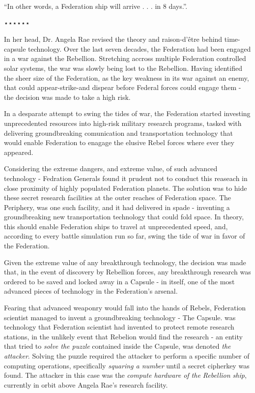 \documentclass[smalldemyvopaper,11pt,twoside,onecolumn,openright,extrafontsizes]{memoir}
\begin{document}
 “In other words, a Federation ship will arrive . . . in 8 days.”.

⋆⋆⋆⋆⋆⋆


In her head, Dr. Angela Rae revised the theory and raison-d’être behind time-capsule technology. Over the last seven decades, the Federation had been engaged in a war against the Rebellion. Stretching accross multiple Federation controlled solar systems, the war was slowly being lost to the Rebellion. Having identified the sheer size of the Federation, as the key weakness in its war against an enemy, that could appear-strike-and dispear before Federal forces could engage them - the decision was made to take a high risk.

 
 In a desparate attempt to swing the tides of war, the Federation started investing unprecedented resources into high-risk military research programs, tasked with delivering groundbreaking comunication and transportation technology that would enable Federation to enagage the elusive Rebel forces where ever they appeared.

 
  Considering the extreme dangers, and extreme value, of such advanced technology - Fedration Generals found it prudent not to conduct this reaseach in close proximity of highly populated Federation planets. The solution was to hide these secret research facilities at the outer reaches of Federation space. The Periphery, was one such facility, and it had delivered in spade - inventing a groundbreaking new transportation technology that could fold space. In theory, this should enable Federation ships to travel at unprecedented speed, and, according to every battle simulation run so far, swing the tide of war in favor of the Federation.

 
  Given the extreme value of any breakthrough technology, the decision was made that, in the event of discovery by Rebellion forces, any breakthrough research was ordered to be saved and locked away in a Capsule - in itself, one of the most advanced pieces of technology in the Federation’s arsenal.

 
  Fearing that advanced weaponry would fall into the hands of Rebels, Federation scientist managed to invent a groundbreaking technology - The Capsule. was technology that Federation scientist had invented to protect remote research stations, in the unlikely event that Rebelion would find the research - an entity that tried to \textit{solve the puzzle} contained inside the Capsule, was denoted \textit{the attacker}. Solving the puzzle required the attacker to perform a specific number of computing operations, specifically \textit{squaring a number} until a secret cipherkey was found. The attacker in this case was the \textit{compute hardware of the Rebellion ship}, currently in orbit above Angela Rae’s research facility.
\end{document}
